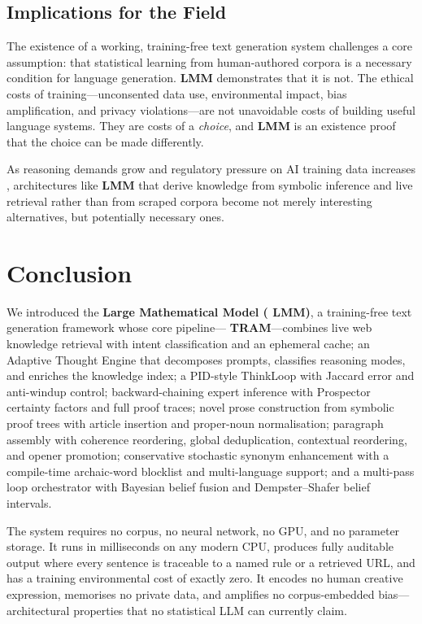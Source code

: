 \documentclass[11pt,a4paper]{article}
\newcommand{\lmm}{\texorpdfstring{%
  \textbf{\color{lmmAccent}LMM}}{LMM}}
\newcommand{\tram}{\texorpdfstring{%
  \textbf{\color{lmmTeal}TRAM}}{TRAM}}
\begin{document}
\subsection{Implications for the Field}

The existence of a working, training-free text generation system challenges a core assumption:
that statistical learning from human-authored corpora is a necessary condition for language
generation. \lmm{} demonstrates that it is not. The ethical costs of training---unconsented
data use, environmental impact, bias amplification, and privacy violations---are not
unavoidable costs of building useful language systems. They are costs of a \emph{choice},
and \lmm{} is an existence proof that the choice can be made differently.

As reasoning demands grow and regulatory pressure on AI training data increases
\citep{COPYRIGHT_AI_REPORT_2025}, architectures like \lmm{} that derive knowledge from
symbolic inference and live retrieval rather than from scraped corpora become not merely
interesting alternatives, but potentially necessary ones.

\section{Conclusion}
\label{sec:conclusion}

We introduced the \textbf{Large Mathematical Model (\lmm{})}, a training-free text generation
framework whose core pipeline---\tram{}---combines live web knowledge retrieval with intent
classification and an ephemeral cache; an Adaptive Thought Engine that decomposes prompts,
classifies reasoning modes, and enriches the knowledge index; a PID-style ThinkLoop with
Jaccard error and anti-windup control; backward-chaining expert inference with Prospector
certainty factors and full proof traces; novel prose construction from symbolic proof trees
with article insertion and proper-noun normalisation; paragraph assembly with coherence
reordering, global deduplication, contextual reordering, and opener promotion; conservative
stochastic synonym enhancement with a compile-time archaic-word blocklist and multi-language
support; and a multi-pass loop orchestrator with Bayesian belief fusion and Dempster--Shafer
belief intervals.

The system requires no corpus, no neural network, no GPU, and no parameter storage. It runs
in milliseconds on any modern CPU, produces fully auditable output where every sentence is
traceable to a named rule or a retrieved URL, and has a training environmental cost of exactly
zero. It encodes no human creative expression, memorises no private data, and amplifies no
corpus-embedded bias---architectural properties that no statistical LLM can currently claim.
\end{document}
